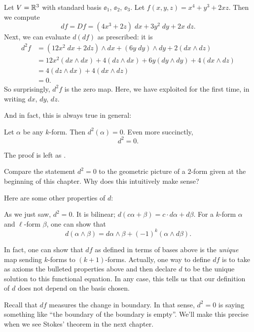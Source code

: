 \begin{example}
	Let $V = \mathbb R^3$ with standard basis $\ee_1$, $\ee_2$, $\ee_3$.
	Let $f(x,y,z) = x^4 + y^3 + 2xz$.
	Then we compute
	\[ df = Df = (4x^3+2z) \; dx + 3y^2 \; dy + 2x \; dz. \]
	Next, we can evaluate $d(df)$ as prescribed: it is
	\begin{align*}
		d^2f &= (12x^2 \; dx + 2 dz) \wedge dx + (6y \; dy) \wedge dy
		+ 2(dx \wedge dz) \\
		&= 12x^2 (dx \wedge dx) + 4(dz \wedge dx) + 6y (dy \wedge dy) + 4(dx \wedge dz) \\
		&= 4(dz \wedge dx) + 4(dx \wedge dz) \\
		&= 0.
	\end{align*}
	So surprisingly, $d^2f$ is the zero map.
	Here, we have exploited  for the first time,
	in writing $dx$, $dy$, $dz$.
\end{example}
And in fact, this is always true in general:
\begin{theorem}
	\label{thm:dd_zero}
	Let $\alpha$ be any $k$-form.
	Then $d^2(\alpha) = 0$.
	Even more succinctly, \[ d^2 = 0. \]
\end{theorem}
The proof is left as .
\begin{exercise}
	Compare the statement $d^2 = 0$ to the geometric
	picture of a $2$-form given at the beginning of this chapter.
	Why does this intuitively make sense?
\end{exercise}

Here are some other properties of $d$:
\begin{itemize}
	\ii As we just saw, $d^2 = 0$.
	\ii It is bilinear; $d(c\alpha+\beta) = c \cdot d\alpha + d\beta$.
	\ii For a $k$-form $\alpha$ and $\ell$-form $\beta$, one can show that
	\[ d(\alpha \wedge \beta) = d\alpha \wedge \beta + (-1)^k (\alpha \wedge d\beta). \]
\end{itemize}
In fact, one can show that $df$ as defined in terms of bases above is
the \emph{unique} map sending $k$-forms to $(k+1)$-forms.
Actually, one way to define $df$ is to take as axioms the bulleted properties above
and then declare $d$ to be the unique solution to this functional equation.
In any case, this tells us that our definition of $d$
does not depend on the basis chosen.

Recall that $df$ measures the change in boundary.
In that sense, $d^2 = 0$ is saying something like
``the boundary of the boundary is empty''.
We'll make this precise when we see Stokes' theorem in the next chapter.


